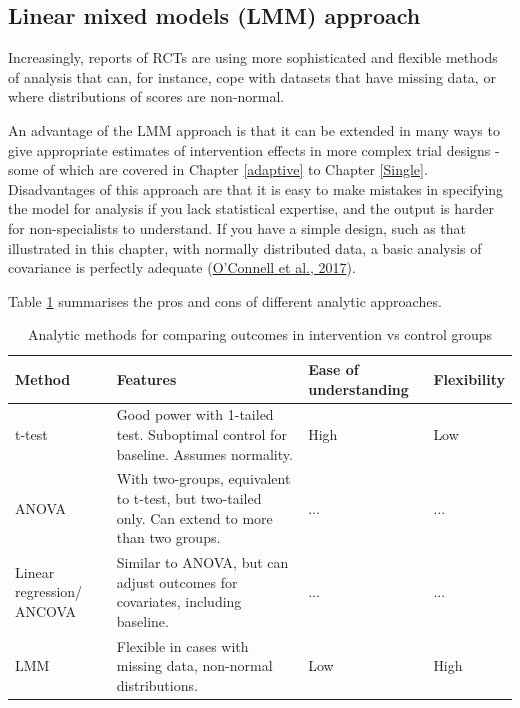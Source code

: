 \documentclass{krantz}
\begin{document}
\hypertarget{linear-mixed-models-lmm-approach}{%
\subsection{Linear mixed models (LMM) approach}\label{linear-mixed-models-lmm-approach}}

Increasingly, reports of RCTs are using more sophisticated and flexible methods of analysis that can, for instance, cope with datasets that have missing data, or where distributions of scores are non-normal.

An advantage of the LMM approach is that it can be extended in many ways to give appropriate estimates of intervention effects in more complex trial designs - some of which are covered in Chapter \ref{adaptive} to Chapter \ref{Single}. Disadvantages of this approach are that it is easy to make mistakes in specifying the model for analysis if you lack statistical expertise, and the output is harder for non-specialists to understand. If you have a simple design, such as that illustrated in this chapter, with normally distributed data, a basic analysis of covariance is perfectly adequate (\protect\hyperlink{ref-oconnell2017}{O'Connell et al., 2017}).

Table \ref{tab:table-procon} summarises the pros and cons of different analytic approaches.

\begin{table}

\caption{\label{tab:table-procon}Analytic methods for comparing outcomes in intervention vs control groups}
\centering
\begin{tabular}[t]{>{\centering\arraybackslash}p{7em}>{\centering\arraybackslash}p{12em}>{\centering\arraybackslash}p{7em}>{\centering\arraybackslash}p{7em}}
\toprule
Method & Features & Ease of understanding & Flexibility\\
\midrule
t-test & Good power with 1-tailed test. 
Suboptimal control for baseline. 
Assumes normality. & High & Low\\
ANOVA & With two-groups, equivalent to t-test, 
but two-tailed only. 
Can extend to more than two groups. & ... & ...\\
Linear regression/ ANCOVA & Similar to ANOVA, but can adjust 
outcomes for covariates, 
including baseline. & ... & ...\\
LMM & Flexible in cases with missing data, 
non-normal distributions. & Low & High\\
\bottomrule
\end{tabular}
\end{table}
\end{document}
